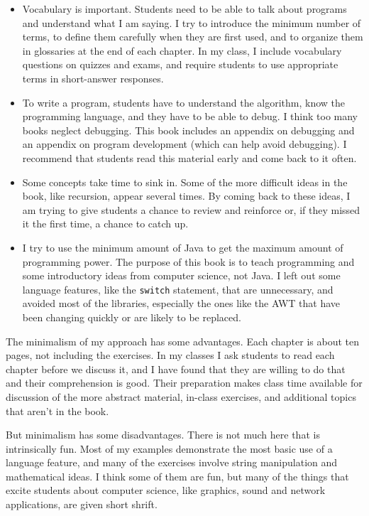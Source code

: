 \begin{itemize}

\item Vocabulary is important.  Students need to be able to talk
about programs and understand what I am saying.  I try to
introduce the minimum number of terms, to define them carefully
when they are first used, and to organize them in glossaries
at the end of each chapter.  In my class, I include vocabulary
questions on quizzes and exams, and require students to use
appropriate terms in short-answer responses.

\item To write a program, students have to understand the
algorithm, know the programming language, and they have to be
able to debug.  I think too many books neglect debugging.  This
book includes an appendix on debugging and an appendix on program
development (which can help avoid debugging).  I recommend that
students read this material early and come back to it often.

\item Some concepts take time to sink in.  Some of the more
difficult ideas in the book, like recursion, appear several times.
By coming back to these ideas, I am trying to give students a
chance to review and reinforce or, if they missed it the first time,
a chance to catch up.

\item I try to use the minimum amount of Java to get the
maximum amount of programming power.  The purpose of this book
is to teach programming and some introductory ideas from computer
science, not Java.  I left out some language features, like
the {\tt switch} statement, that are unnecessary, and avoided
most of the libraries, especially the ones like the AWT that have been
changing quickly or are likely to be replaced.

\end{itemize}

The minimalism of my approach has some advantages.
Each chapter is about ten pages, not including the exercises.
In my classes I ask students to read each chapter before we
discuss it, and I have found that they are willing to do that
and their comprehension is good.  Their preparation makes
class time available for discussion of the more abstract material,
in-class exercises, and additional topics that aren't in the
book.

But minimalism has some disadvantages.  There is not much here
that is intrinsically fun.  Most of my examples demonstrate the
most basic use of a language feature, and many of the exercises
involve string manipulation and mathematical ideas.  I think some
of them are fun, but many of the things that excite students
about computer science, like graphics, sound and network applications,
are given short shrift.

